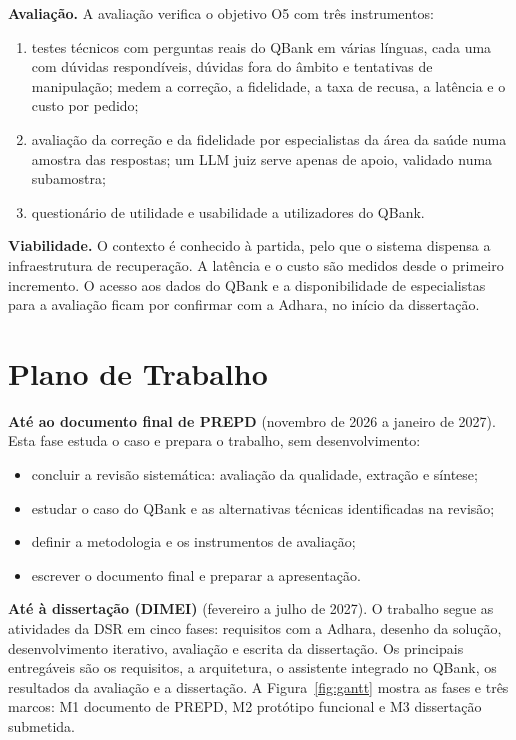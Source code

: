 \documentclass[11pt,a4paper]{article}
\begin{document}
\textbf{Avaliação.} A avaliação verifica o objetivo O5 com três instrumentos:
\begin{enumerate}[leftmargin=1.2cm]
    \item testes técnicos com perguntas reais do QBank em várias línguas, cada uma com dúvidas respondíveis, dúvidas fora do âmbito e tentativas de manipulação; medem a correção, a fidelidade, a taxa de recusa, a latência e o custo por pedido;
    \item avaliação da correção e da fidelidade por especialistas da área da saúde numa amostra das respostas; um LLM juiz serve apenas de apoio, validado numa subamostra;
    \item questionário de utilidade e usabilidade a utilizadores do QBank.
\end{enumerate}

\textbf{Viabilidade.} O contexto é conhecido à partida, pelo que o sistema dispensa a infraestrutura de recuperação. A latência e o custo são medidos desde o primeiro incremento. O acesso aos dados do QBank e a disponibilidade de especialistas para a avaliação ficam por confirmar com a Adhara, no início da dissertação.

\section{Plano de Trabalho}

\textbf{Até ao documento final de PREPD} (novembro de 2026 a janeiro de 2027). Esta fase estuda o caso e prepara o trabalho, sem desenvolvimento:
\begin{itemize}
    \item concluir a revisão sistemática: avaliação da qualidade, extração e síntese;
    \item estudar o caso do QBank e as alternativas técnicas identificadas na revisão;
    \item definir a metodologia e os instrumentos de avaliação;
    \item escrever o documento final e preparar a apresentação.
\end{itemize}

\textbf{Até à dissertação (DIMEI)} (fevereiro a julho de 2027). O trabalho segue as atividades da DSR em cinco fases: requisitos com a Adhara, desenho da solução, desenvolvimento iterativo, avaliação e escrita da dissertação. Os principais entregáveis são os requisitos, a arquitetura, o assistente integrado no QBank, os resultados da avaliação e a dissertação. A Figura~\ref{fig:gantt} mostra as fases e três marcos: M1 documento de PREPD, M2 protótipo funcional e M3 dissertação submetida.
\end{document}
